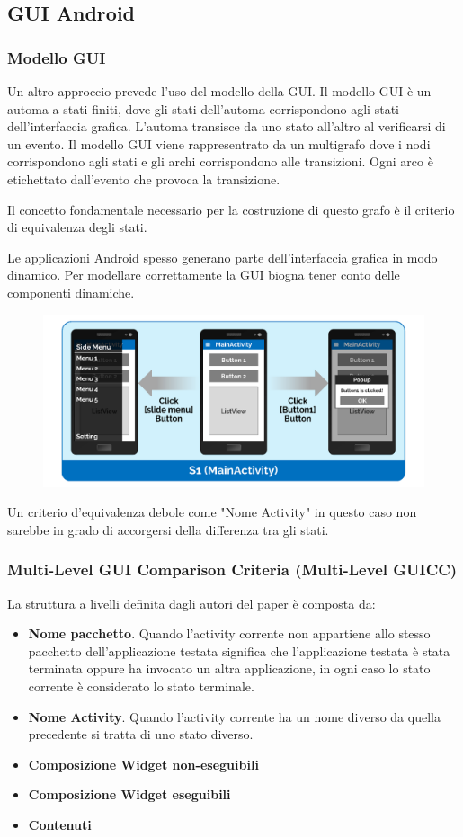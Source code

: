\documentclass[12pt]{beamer}
\begin{document}
\subsection{GUI Android}
\begin{frame}
    \frametitle{Modello GUI}
Un altro approccio prevede l'uso del modello della GUI.
Il modello GUI \`e un automa a stati finiti, dove gli stati dell'automa corrispondono agli stati dell'interfaccia grafica. L'automa transisce da uno stato all'altro al verificarsi di un evento.
Il modello GUI viene rappresentrato da un multigrafo dove i nodi corrispondono agli stati e gli archi corrispondono alle transizioni. Ogni arco \`e etichettato dall'evento che provoca la transizione.

Il concetto fondamentale necessario per la costruzione di questo grafo \`e il criterio di equivalenza degli stati.

\end{frame}

\begin{frame}{}

    Le applicazioni Android spesso generano parte dell'interfaccia grafica in modo dinamico.
    Per modellare correttamente la GUI biogna tener conto delle componenti dinamiche.

    \begin{figure}
    \includegraphics[width=0.8\linewidth]{images/Dynamic.png}
    \end{figure}
Un criterio d'equivalenza debole come "Nome Activity" in questo caso non sarebbe in grado di accorgersi della differenza tra gli stati.
\end{frame}

\begin{frame}
    \frametitle{Multi-Level
GUI Comparison Criteria (Multi-Level GUICC)}
La struttura a livelli definita dagli autori del paper \`e composta da:
\begin{itemize}
    \item \textbf{Nome pacchetto}. Quando l'activity corrente non appartiene allo stesso pacchetto dell'applicazione testata significa che l'applicazione testata \`e stata terminata oppure ha invocato un altra applicazione, in ogni caso lo stato corrente \`e considerato lo stato terminale.
    \item \textbf{Nome Activity}. Quando l'activity corrente ha un nome diverso da quella precedente si tratta di uno stato diverso.
    \item \textbf{Composizione Widget non-eseguibili}
    \item \textbf{Composizione Widget eseguibili}
    \item \textbf{Contenuti}
\end{itemize}
\end{frame}
\end{document}
